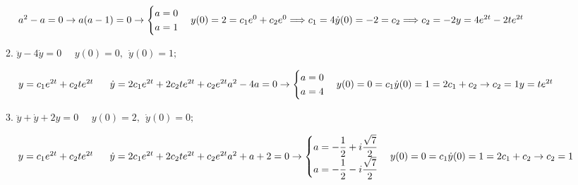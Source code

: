 \documentclass[fleqn]{article}
\begin{document}
\begin{enumerate}
\begin{enumerate}
          \textcolor{hwColor}{
            $
              a^2-a=0 \rightarrow a(a-1)=0 \rightarrow \begin{cases}
                a=0 \\
                a=1
              \end{cases}\\
              \\
              y(0)=2=c_1e^0+c_2e^0 \Longrightarrow c_1=4 \\
              \dot y(0)=-2=c_2 \Longrightarrow c_2=-2 \\
              \\
              \\
              y=4e^{2t}-2te^{2t}
            $     
          }

        \item $\ddot y-4\dot y=0 ~~~~~~ y(0)=0, ~~ \dot y(0)=1;$

          \textcolor{hwColor}{
            $
              y=c_1e^{2t}+c_2te^{2t} ~~~~~ \dot y=2c_1e^{2t}+2c_2te^{2t}+c_2e^{2t} \\
              \\
              a^2-4a=0 \rightarrow \begin{cases}
                a=0 \\
                a=4 \\
              \end{cases} \\
              \\
              y(0)=0=c_1 \\
              \dot y(0)=1=2c_1+c_2 \rightarrow c_2=1 \\
              \\
              \\
              y=te^{2t}
            $     
          }

        \item $\ddot y+\dot y+2y=0 ~~~~~~ y(0)=2, ~~ \dot y(0)=0;$
        
          \textcolor{hwColor}{
            $
              y=c_1e^{2t}+c_2te^{2t} ~~~~~ \dot y=2c_1e^{2t}+2c_2te^{2t}+c_2e^{2t} \\
              \\
              a^2+a+2=0 \rightarrow \begin{cases}
                a=-\dfrac{1}{2}+i\dfrac{\sqrt{7}}{2} \\
                a=-\dfrac{1}{2}-i\dfrac{\sqrt{7}}{2} \\
              \end{cases} \\
              \\
              y(0)=0=c_1 \\
              \dot y(0)=1=2c_1+c_2 \rightarrow c_2=1 \\
              \\
              \\
            $     
          }

      \end{enumerate}
    
  \end{enumerate}
\end{document}
